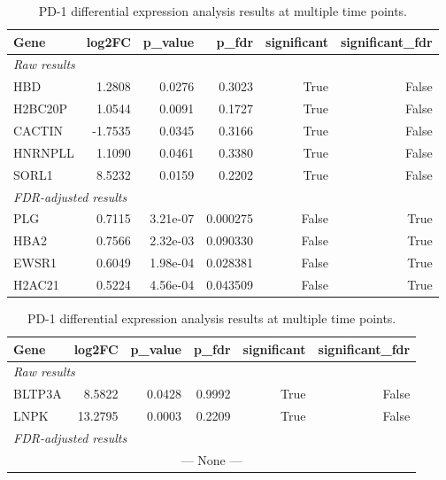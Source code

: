 \documentclass{article}
\begin{document}
      \begin{table}[H]

        \centering

        \caption{PD-1 differential expression analysis results at multiple time points.}
        \label{tab:pd1_results}

        \begin{tabular}{lrrrrr}
          \toprule
          Gene & log2FC & p\_value & p\_fdr & significant & significant\_fdr \\
          \midrule
          \multicolumn{6}{l}{\textit{Raw results}} \\
          HBD      &  1.2808 & 0.0276 & 0.3023 & True  & False \\
          H2BC20P  &  1.0544 & 0.0091 & 0.1727 & True  & False \\
          CACTIN   & -1.7535 & 0.0345 & 0.3166 & True  & False \\
          HNRNPLL  &  1.1090 & 0.0461 & 0.3380 & True  & False \\
          SORL1    &  8.5232 & 0.0159 & 0.2202 & True  & False \\
          \midrule
          \multicolumn{6}{l}{\textit{FDR-adjusted results}} \\
          PLG     & 0.7115 & 3.21e-07 & 0.000275 & False & True \\
          HBA2    & 0.7566 & 2.32e-03 & 0.090330 & False & True \\
          EWSR1   & 0.6049 & 1.98e-04 & 0.028381 & False & True \\
          H2AC21  & 0.5224 & 4.56e-04 & 0.043509 & False & True \\
          \bottomrule
        \end{tabular}

        \vspace{1em}

        \begin{tabular}{lrrrrr}
          \toprule
          Gene & log2FC & p\_value & p\_fdr & significant & significant\_fdr \\
          \midrule
          \multicolumn{6}{l}{\textit{Raw results}} \\
          BLTP3A   &  8.5822 & 0.0428 & 0.9992 & True  & False \\
          LNPK     & 13.2795 & 0.0003 & 0.2209 & True  & False \\
          \midrule
          \multicolumn{6}{l}{\textit{FDR-adjusted results}} \\
          \multicolumn{6}{c}{--- None ---} \\
          \bottomrule
        \end{tabular}


\end{table}
\end{document}
